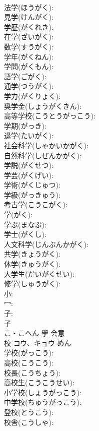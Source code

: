 \documentclass[8pt]{extreport}
\begin{document}
\begin{CJK}{UTF8}{min}
\\	法学(ほうがく): 
\\	見学(けんがく): 
\\	学歴(がくれき): 
\\	在学(ざいがく): 
\\	数学(すうがく): 
\\	学年(がくねん): 
\\	学問(がくもん): 
\\	語学(ごがく): 
\\	通学(つうがく): 
\\	学力(がくりょく): 
\\	奨学金(しょうがくきん): 
\\	高等学校(こうとうがっこう): 
\\	学期(がっき): 
\\	退学(たいがく): 
\\	社会科学(しゃかいかがく): 
\\	自然科学(しぜんかがく): 
\\	学説(がくせつ): 
\\	学芸(がくげい): 
\\	学術(がくじゅつ): 
\\	学級(がっきゅう): 
\\	考古学(こうこがく): 
\\	学(がく): 
\\	学ぶ(まなぶ): 
\\	学士(がくし): 
\\	人文科学(じんぶんかがく): 
\\	共学(きょうがく): 
\\	休学(きゅうがく): 
\\	大学生(だいがくせい): 
\\	修学(しゅうがく): 
\\	小: 
\\	冖: 
\\	子: 
\\	子	
\\	こ・こへん	學	会意 
\\	校	コウ、キョウ		めん	
\\	学校(がっこう): 
\\	高校(こうこう): 
\\	校長(こうちょう): 
\\	高校生(こうこうせい): 
\\	小学校(しょうがっこう): 
\\	中学校(ちゅうがっこう): 
\\	登校(とうこう): 
\\	校舎(こうしゃ): 

\end{CJK}
\end{document}
